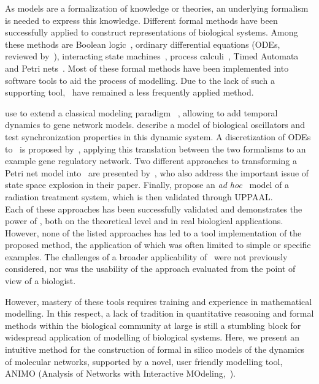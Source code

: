 As models are a formalization of knowledge or theories, an underlying formalism is needed to express
this knowledge. Different formal methods have been successfully applied to construct representations
of biological systems. Among these methods are Boolean logic~\citep{boolean-networks-flower,boolean-networks2},
ordinary differential equations (ODEs, reviewed by~\citealp[]{hidde-review}),
interacting state machines~\citep{interacting-sm1,interacting-sm2},
process calculi~\citep{blenx,bio-pepa}, Timed Automata~\citep{ta-siebert,bartocci-oscillators,
oded-ode-ta-discretization} and Petri nets~\citep{petri-nets,petri-nets2}.
Most of these formal methods have been implemented into software tools to aid the process
of modelling. Due to the lack of such a supporting tool, \tas\ have remained a less 
frequently applied method.

\cite{ta-siebert} use \tas to extend a classical modeling paradigm
~\citep{thomas-formalism}, allowing to add temporal dynamics to gene network models.
\cite{bartocci-oscillators} describe a model of biological oscillators and test 
synchronization properties in this dynamic system.
A discretization of ODEs to \tas\ is proposed by~\citet{oded-ode-ta-discretization}, applying
this translation between the two formalisms to an example gene regulatory network. Two 
different approaches to transforming
a Petri net model into \tas\ are presented by~\citet{ta-giapponesi},
who also address the important issue of state space explosion in their paper.
Finally, \cite{ta-radiazioni} propose an \emph{ad hoc} \tas\ model of a radiation treatment
system, which is then validated through UPPAAL.\\
Each of these approaches has been successfully validated and demonstrates the power of \tas,
both on the theoretical level and in real biological applications. However, none of the listed approaches
has led to a tool implementation of the proposed method, the application of which was often limited to simple
or specific examples. The challenges of a broader applicability of \tas\ were not previously considered,
nor was the usability of the approach evaluated from the point of view of a biologist.

However, mastery of these tools requires
training and experience in mathematical modelling. In this respect, a lack of tradition in quantitative
reasoning and formal methods within the biological community at large is still a stumbling block for
widespread application of modelling of biological systems. Here, we present an intuitive method for the
construction of formal in silico models of the dynamics of molecular networks, supported by a novel,
user friendly modelling tool, ANIMO (Analysis of Networks with Interactive MOdeling,~\citealp[]{animo-bibe}).

